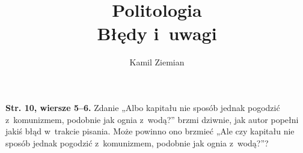 \documentclass[a4paper,11pt]{article}
\title{Politologia \\
  Błędy i~uwagi}
\author{Kamil Ziemian}
\begin{document}





\maketitle  %


























\start \textbf{Str. 10, wiersze 5--6.} Zdanie „Albo kapitału nie sposób
jednak pogodzić z~komunizmem, podobnie jak ognia z~wodą?” brzmi dziwnie,
jak autor popełni jakiś błąd w~trakcie pisania. Może powinno ono brzmieć
„Ale czy kapitału nie sposób jednak pogodzić z~komunizmem, podobnie jak
ognia z~wodą?”?

\vspace{\spaceFour}
\end{document}
